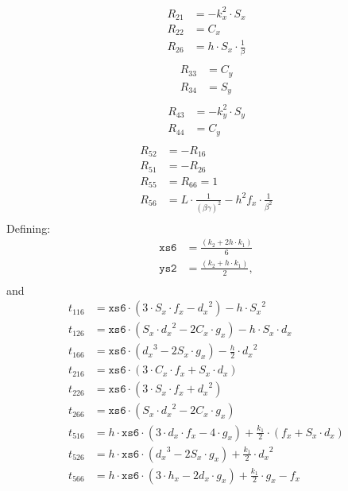 \documentclass{cern-art} %
\begin{document}
\[
\begin{array}{rl}
  R_{21} &= - {k_{x}^{2}} {\cdot} {S_x}\\
  R_{22} &= {C_x}\\
  R_{26} &= h {\cdot} {S_x} {\cdot} {\frac 1 \beta}\\
\end{array}
\]
\[
\begin{array}{rl}
  R_{33} &= {C_y}\\
  R_{34} &= {S_y}\\
\end{array}
\]
\[
\begin{array}{rl}
  R_{43} &= - {k_{y}^{2}} {\cdot} {S_y}\\
  R_{44} &= {C_y}\\
\end{array}
\]
\[
\begin{array}{rl}
  R_{52} &= - R_{16}\\
  R_{51} &= - R_{26}\\
  R_{55} & = R_{66} = 1\\
  R_{56} &= L{\cdot} \frac 1 {{(\beta\gamma)}^2} - h^2 {f_x}{\cdot} {\frac 1{\beta^2}}\\
\end{array}
\]
Defining:
\[
\begin{array}{rl}
    \texttt{xs6} &= \frac{\left({k_2} + 2 h{\cdot}{k_1}\right)}{6}\\
     \texttt{ys2} &= \frac{ \left({k_2} +     h{\cdot}{k_1}\right)}{2},\\
\end{array}
\]
and
\[
\begin{array}{rl}
     t_{116} &= \texttt{xs6} {\cdot} \left(3{\cdot}{S_x}{\cdot}{f_x} - {d_x}^2\right) - h {\cdot} {S_x}^2\\
     t_{126} &= \texttt{xs6} {\cdot} \left({S_x}{\cdot}{d_x}^2 - 2 {C_x}{\cdot}{g_x}\right) - h {\cdot} {S_x} {\cdot} {d_x}\\
     t_{166} &= \texttt{xs6} {\cdot} \left({d_x}^3 - 2 {S_x}{\cdot}{g_x}\right) - \frac{h}{2} {\cdot} {d_x}^2\\
     t_{216} &= \texttt{xs6} {\cdot} \left(3{\cdot}{C_x}{\cdot}{f_x} + {S_x}{\cdot}{d_x}\right)\\
     t_{226} &= \texttt{xs6} {\cdot} \left(3{\cdot}{S_x}{\cdot}{f_x} + {d_x}^2\right)\\
     t_{266} &= \texttt{xs6} {\cdot} \left({S_x}{\cdot}{d_x}^2 - 2 {C_x}{\cdot}{g_x}\right)\\
     t_{516} &= h {\cdot} \texttt{xs6} {\cdot} \left(3{\cdot}{d_x}{\cdot}{f_x} - 4{\cdot}{g_x}\right) + {\frac{k_1}{2}} {\cdot} \left({f_x} + {S_x}{\cdot}{d_x}\right)\\
     t_{526} &= h {\cdot} \texttt{xs6} {\cdot} \left({d_x}^3 - 2 {S_x}{\cdot}{g_x}\right) + {\frac{k_1}{2}} {\cdot} {d_x}^2\\
     t_{566} &= h {\cdot} \texttt{xs6} {\cdot} \left(3{\cdot}{h_x} - 2 {d_x}{\cdot}{g_x}\right) +  {\frac{k_1}{2}} {\cdot} {g_x} - {f_x}\\
\end{array}
\]
\end{document}
